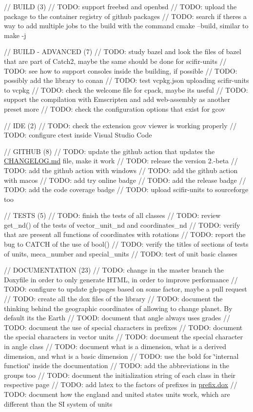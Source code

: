 // BUILD (3) // TODO\+: support freebsd and openbsd // TODO\+: upload the package to the container registry of github packages // TODO\+: search if there\textquotesingle{}s a way to add multiple jobs to the build with the command cmake --build, similar to make -\/j

// BUILD -\/ ADVANCED (7) // TODO\+: study bazel and look the files of bazel that are part of Catch2, maybe the same should be done for scifir-\/units // TODO\+: see how to support consoles inside the building, if possible // TODO\+: possibly add the library to conan // TODO\+: test vcpkg.\+json uploading scifir-\/units to vcpkg // TODO\+: check the welcome file for cpack, maybe it\textquotesingle{}s useful // TODO\+: support the compilation with Emscripten and add web-\/assembly as another preset more // TODO\+: check the configuration options that exist for gcov

// IDE (2) // TODO\+: check the extension gcov viewer is working properly // TODO\+: configure ctest inside Visual Studio Code

// GITHUB (8) // TODO\+: update the github action that updates the \mbox{\hyperlink{CHANGELOG_8md}{CHANGELOG.\+md}} file, make it work // TODO\+: release the version 2.-\/beta // TODO\+: add the github action with windows // TODO\+: add the github action with macos // TODO\+: add try online badge // TODO\+: add the release badge // TODO\+: add the code coverage badge // TODO\+: upload scifir-\/units to sourceforge too

// TESTS (5) // TODO\+: finish the tests of all classes // TODO\+: review get\+\_\+nd() of the tests of vector\+\_\+unit\+\_\+nd and coordinates\+\_\+nd // TODO\+: verify that are present all functions of coordinates with rotations // TODO\+: report the bug to CATCH of the use of bool() // TODO\+: verify the titles of sections of tests of units, meca\+\_\+number and special\+\_\+units // TODO\+: test of unit basic classes

// DOCUMENTATION (23) // TODO\+: change in the master branch the Doxyfile in order to only generate HTML, in order to improve performance // TODO\+: configure to update gh-\/pages based on some factor, maybe a pull request // TODO\+: create all the dox files of the library // TODO\+: document the thinking behind the geographic coordinates of allowing to change planet. By default it\textquotesingle{}s the Earth // TOOD\+: document that angle always uses grades // TODO\+: document the use of special characters in prefixes // TODO\+: document the special characters in vector units // TODO\+: document the special character in angle class // TODO\+: document what is a dimension, what is a derived dimension, and what is a basic dimension // TODO\+: use the bold for \char`\"{}internal function\char`\"{} inside the documentation // TODO\+: add the abbreviations in the groups too // TODO\+: document the initialization string of each class in their respective page // TODO\+: add latex to the factors of prefixes in \mbox{\hyperlink{prefix_8dox}{prefix.\+dox}} // TODO\+: document how the england and united states units work, which are different than the SI system of units

